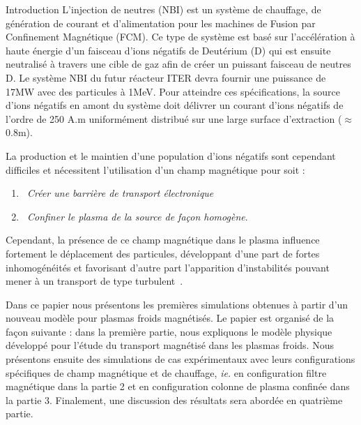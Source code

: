 \documentclass[a4paper,11pt]{article} %
\begin{document}
\begin{section}{Introduction}
L'injection de neutres (NBI) est un système de chauffage, de génération de courant et d'alimentation pour
les machines de Fusion par Confinement Magnétique (FCM). Ce type de système est basé sur l'accélération à haute énergie 
d'un faisceau d'ions négatifs de Deutérium (D\up{-}) qui est ensuite neutralisé à travers une cible de gaz afin de 
créer un puissant faisceau de neutres D. Le système NBI du futur réacteur ITER devra fournir une puissance de 17MW
avec des particules à 1MeV\cite{Hemsworth}. Pour atteindre ces spécifications, la source d'ions négatifs en amont du système 
doit délivrer un courant d'ions négatifs de l'ordre de 250 A.m uniformément distribué sur une large surface 
d'extraction ($\approx$ 0.8m). 

La production et le maintien d'une population d'ions négatifs sont cependant difficiles et nécessitent 
l'utilisation d'un champ magnétique pour soit :
\begin{enumerate}
\item\emph{~Créer une barrière de transport électronique} 
\item\emph{~Confiner le plasma de la source de façon homogène}. 
\end{enumerate}
Cependant, la présence de ce champ magnétique dans le plasma influence fortement le déplacement des particules, 
développant d'une part de fortes inhomogénéités et favorisant d'autre part l'apparition d'instabilités pouvant 
mener à un transport de type turbulent~\cite{Zweben}.

Dans ce papier nous présentons les premières simulations obtenues à partir d'un nouveau modèle pour plasmas froids magnétisés. 
Le papier est organisé de la façon suivante : dans la première partie, nous expliquons le modèle physique développé pour 
l'étude du transport magnétisé dans les plasmas froids. Nous présentons ensuite des simulations de cas expérimentaux 
avec leurs configurations spécifiques de champ magnétique et de chauffage, \emph{ie.} en configuration filtre magnétique
dans la partie 2 et en configuration colonne de plasma confinée dans la partie 3. Finalement, une discussion des résultats
sera abordée en quatrième partie.
\end{section}
\end{document}
